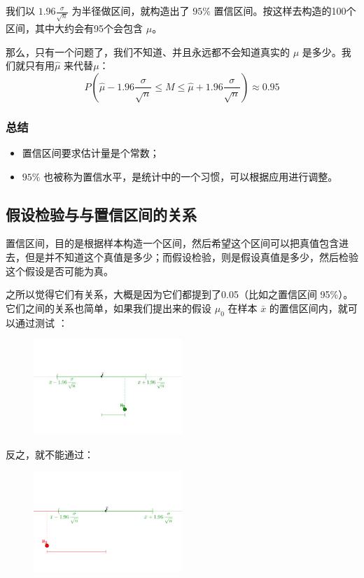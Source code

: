 \documentclass[12pt]{article}
\begin{document}
我们以 $1.96\frac{\sigma}{\sqrt{n}}$ 为半径做区间，就构造出了  $95\%$ 置信区间。按这样去构造的100个区间，其中大约会有95个会包含 $\mu$。

那么，只有一个问题了，我们不知道、并且永远都不会知道真实的 $\mu$ 是多少。我们就只有用$\hat{\mu}$ 来代替$\mu$：
$$
P(\hat{\mu} - 1.96\frac{\sigma}{\sqrt{n}} \le M \le \hat{\mu} + 1.96\frac{\sigma}{\sqrt{n}}) \approx 0.95
$$

\subsubsection{总结}
\begin{itemize}
\setlength{\itemsep}{0pt}
\setlength{\parsep}{0pt}
\setlength{\parskip}{0pt}
    \item 置信区间要求估计量是个常数；
    \item $95\%$ 也被称为置信水平，是统计中的一个习惯，可以根据应用进行调整。
\end{itemize}

\subsection{假设检验与与置信区间的关系}
置信区间，目的是根据样本构造一个区间，然后希望这个区间可以把真值包含进去，但是并不知道这个真值是多少；而假设检验，则是假设真值是多少，然后检验这个假设是否可能为真。

之所以觉得它们有关系，大概是因为它们都提到了0.05（比如之置信区间 95\%）。它们之间的关系也简单，如果我们提出来的假设 $\mu_0$ 在样本 $\bar{x}$ 的置信区间内，就可以通过测试
：
\begin{figure}[H]
    \centering
    \includegraphics[width=0.5\textwidth]{fig/P_Value_Confidential_Example_1.jpg}
\end{figure}

反之，就不能通过：
\begin{figure}[H]
    \centering
    \includegraphics[width=0.5\textwidth]{fig/P_Value_Confidential_Example_2.png}
\end{figure}
\end{document}
